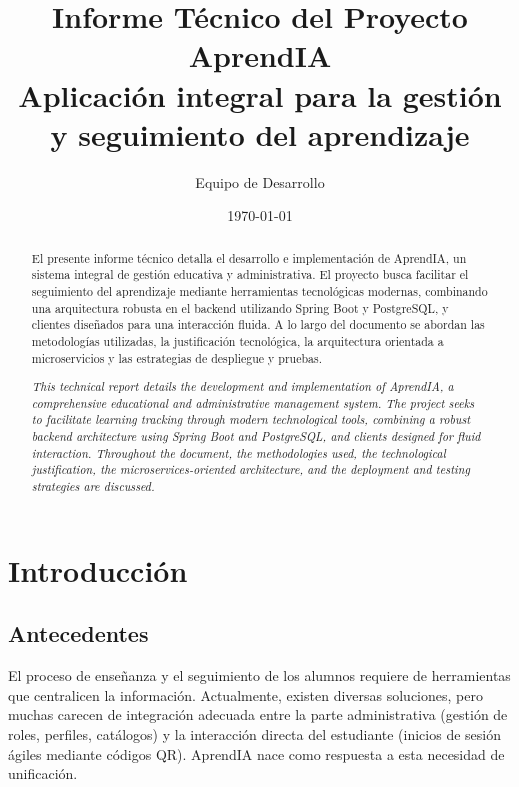 \documentclass[12pt, a4paper]{article}
\title{
    \vspace{2cm}
    \Huge \textbf{Informe Técnico del Proyecto} \\
    \vspace{1cm}
    \LARGE \textbf{AprendIA} \\
    \vspace{0.5cm}
    \large Aplicación integral para la gestión y seguimiento del aprendizaje \\
    \vspace{2cm}
}
\author{Equipo de Desarrollo}
\date{\today}
\begin{document}
\maketitle
\thispagestyle{empty}
\newpage

\begin{abstract}
El presente informe técnico detalla el desarrollo e implementación de AprendIA, un sistema integral de gestión educativa y administrativa. El proyecto busca facilitar el seguimiento del aprendizaje mediante herramientas tecnológicas modernas, combinando una arquitectura robusta en el backend utilizando Spring Boot y PostgreSQL, y clientes diseñados para una interacción fluida. A lo largo del documento se abordan las metodologías utilizadas, la justificación tecnológica, la arquitectura orientada a microservicios y las estrategias de despliegue y pruebas.
\end{abstract}

\renewcommand{\abstractname}{Abstract}
\begin{abstract}
\textit{This technical report details the development and implementation of AprendIA, a comprehensive educational and administrative management system. The project seeks to facilitate learning tracking through modern technological tools, combining a robust backend architecture using Spring Boot and PostgreSQL, and clients designed for fluid interaction. Throughout the document, the methodologies used, the technological justification, the microservices-oriented architecture, and the deployment and testing strategies are discussed.}
\end{abstract}

\newpage
\tableofcontents
\newpage
\listoftables
\newpage
\listoffigures
\newpage

\section{Introducción}

\subsection{Antecedentes}
El proceso de enseñanza y el seguimiento de los alumnos requiere de herramientas que centralicen la información. Actualmente, existen diversas soluciones, pero muchas carecen de integración adecuada entre la parte administrativa (gestión de roles, perfiles, catálogos) y la interacción directa del estudiante (inicios de sesión ágiles mediante códigos QR). AprendIA nace como respuesta a esta necesidad de unificación.
\end{document}
